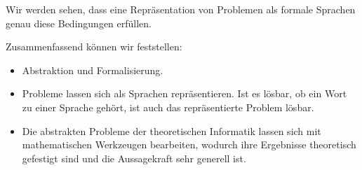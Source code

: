 Wir werden sehen, dass eine Repräsentation von Problemen als formale Sprachen genau diese Bedingungen erfüllen.

Zusammenfassend können wir feststellen:
\begin{itemize}
    \item Abstraktion und Formalisierung.
    \item Probleme lassen sich als Sprachen repräsentieren.
        Ist es lösbar, ob ein Wort zu einer Sprache gehört,
        ist auch das repräsentierte Problem lösbar. 
    \item Die abstrakten Probleme der theoretischen Informatik lassen sich mit
        mathematischen Werkzeugen bearbeiten,
        wodurch ihre Ergebnisse theoretisch gefestigt sind 
        und die Aussagekraft sehr generell ist.
\end{itemize}
